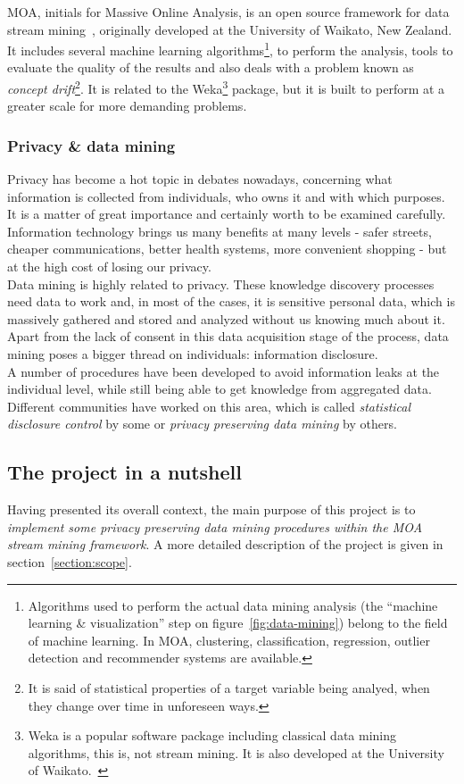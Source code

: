 MOA, initials for Massive Online Analysis, is an open source framework for data stream mining~\cite{website:MOA-Overview}, originally developed at the University of Waikato, New Zealand. It includes several machine learning algorithms\footnote{Algorithms used to perform the actual data mining analysis (the “machine learning \& visualization” step on figure~\ref{fig:data-mining}) belong to the field of machine learning. In MOA, clustering, classification, regression, outlier detection and recommender systems are available.}, to perform the analysis, tools to evaluate the quality of the results and also deals with a problem known as \textit{concept drift}\footnote{It is said of statistical properties of a target variable being analyed, when they change over time in unforeseen ways.}. It is related to the Weka\footnote{Weka is a popular software package including classical data mining algorithms, this is, not stream mining. It is also developed at the University of Waikato.~\cite{website:Weka}} package, but it is built to perform at a greater scale for more demanding problems.

\subsubsection{Privacy \& data mining}

Privacy has become a hot topic in debates nowadays, concerning what information is collected from individuals, who owns it and with which purposes. It is a matter of great importance and certainly worth to be examined carefully. Information technology brings us many benefits at many levels - safer streets, cheaper communications, better health systems, more convenient shopping - but at the high cost of losing our privacy.\\

Data mining is highly related to privacy. These knowledge discovery processes need data to work and, in most of the cases, it is sensitive personal data, which is massively gathered and stored and analyzed without us knowing much about it. Apart from the lack of consent in this data acquisition stage of the process, data mining poses a bigger thread on individuals: information disclosure.\\

A number of procedures have been developed to avoid information leaks at the individual level, while still being able to get knowledge from aggregated data. Different communities have worked on this area, which is called \textit{statistical disclosure control} by some or \textit{privacy preserving data mining} by others.


\subsection{The project in a nutshell}
\label{section:introductionNutshell}
Having presented its overall context, the main purpose of this project is to \textit{implement some privacy preserving data mining procedures within the MOA stream mining framework}. A more detailed description of the project is given in section~\ref{section:scope}.